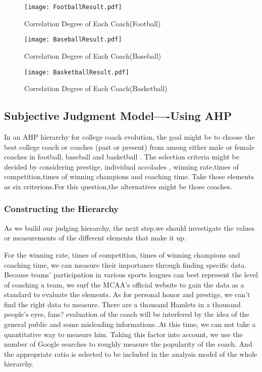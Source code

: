 \documentclass{mcmthesis}
\begin{document}
\begin{figure}[!ht]
\centering
\texttt{[image: FootballResult.pdf]}
\caption{Correlation Degree of Each Coach(Football)}
\label{fig:graph}
\end{figure}

\begin{figure} [!ht]
\centering
\texttt{[image: BaseballResult.pdf]}
\caption{Correlation Degree of Each Coach(Baseball)}
\label{fig:graph}
\end{figure}

\begin{figure} [!ht]
\centering
\texttt{[image: BasketballResult.pdf]}
\caption{Correlation Degree of Each Coach(Basketball)}
\label{fig:graph}
\end{figure}






\subsection{Subjective Judgment Model----Using AHP}
\par In an AHP hierarchy for college coach evolution, the goal might be to choose the best college coach or coaches (past or present) from among either male or female coaches in  football, baseball and basketball . The selection criteria might be decided by considering prestige, individual accolades ,  winning rate,times of competition,times of winning champions and coaching time. Take those elements as six criterions.For this question,the alternatives might be those coaches.
\subsubsection{Constructing the Hierarchy}
\par As we  build our judging  hierarchy, the next step,we should investigate the values or measurements of the different elements that make it up. 
\par For the winning rate, times of competition, times of winning champions and coaching time, we can measure their importance through finding specific data. Because teams' participation in various sports leagues can best represent the level of coaching a team, we surf the MCAA's official website to gain the data as a standard to evaluate the elements. As for personal honor and prestige, we can't find the right data to measure. There are a thousand Hamlets in a thousand people's eyes, fans? evaluation of the coach will be interfered by the idea of the general public and some misleading informations..At this time, we can not take a quantitative way to measure him. Taking this factor into account, we use the number of Google searches to roughly measure the popularity of the coach. And the appropriate ratio is selected to be included in the analysis model of the whole hierarchy.
\end{document}
